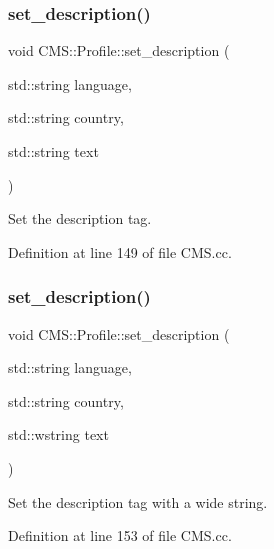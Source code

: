\subsubsection{\texorpdfstring{set\+\_\+description()}{set\_description()}\hspace{0.1cm}{\footnotesize\ttfamily [1/2]}}
{\footnotesize\ttfamily void C\+M\+S\+::\+Profile\+::set\+\_\+description (\begin{DoxyParamCaption}\item[{std\+::string}]{language,  }\item[{std\+::string}]{country,  }\item[{std\+::string}]{text }\end{DoxyParamCaption})}



Set the description tag. 



Definition at line 149 of file C\+M\+S.\+cc.

\mbox{\label{class_c_m_s_1_1_profile_a22b8574b4cf1fe0ca211fb6df9e81259}} 
\subsubsection{\texorpdfstring{set\+\_\+description()}{set\_description()}\hspace{0.1cm}{\footnotesize\ttfamily [2/2]}}
{\footnotesize\ttfamily void C\+M\+S\+::\+Profile\+::set\+\_\+description (\begin{DoxyParamCaption}\item[{std\+::string}]{language,  }\item[{std\+::string}]{country,  }\item[{std\+::wstring}]{text }\end{DoxyParamCaption})}



Set the description tag with a wide string. 



Definition at line 153 of file C\+M\+S.\+cc.

\mbox{\label{class_c_m_s_1_1_profile_a628c7662b1e3986089c807738bdc8cd5}} 
